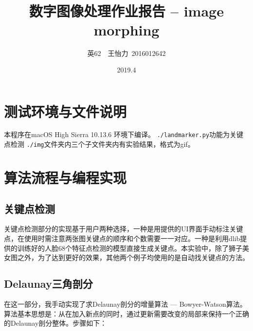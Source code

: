 \documentclass[a4paper]{article}
\title{\bf 数字图像处理作业报告 -- image morphing}
\date{2019.4}
\author{英62~~王怡力~2016012642}
\begin{document}
\kaishu
\ttfamily
\maketitle
\tableofcontents
\newpage

\section{测试环境与文件说明}

本程序在macOS High Sierra 10.13.6 环境下编译。
\texttt{./landmarker.py}功能为关键点检测
\texttt{./img}文件夹内三个子文件夹内有实验结果，格式为gif。


\section{算法流程与编程实现}
\subsection{关键点检测}
关键点检测部分的实现基于用户两种选择，一种是用提供的UI界面手动标注关键点，在使用时需注意两张图关键点的顺序和个数需要一一对应。一种是利用dlib提供的训练好的人脸68个特征点检测的模型直接生成关键点。本实验中，除了狮子美女图之外，为了达到更好的效果，其他两个例子均使用的是自动找关键点的方法。
\begin{figure}[htpb]
  \centering 
\end{figure}
\subsection{Delaunay三角剖分}
在这一部分，我手动实现了求Delaunay剖分的增量算法 --- Bowyer-Watson算法。算法基本思想是：从在加入新点的同时，通过更新需要改变的局部来保持一个正确的Delaunay剖分整体。步骤如下：
\end{document}

